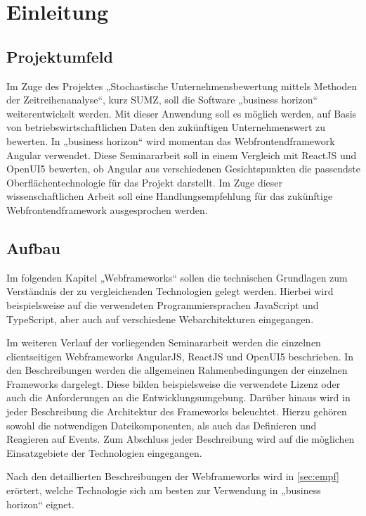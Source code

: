 
\chapter{Einleitung}

\section{Projektumfeld}

Im Zuge des Projektes „Stochastische Unternehmensbewertung mittels Methoden der Zeitreihenanalyse“, kurz SUMZ, soll die Software „business horizon“ weiterentwickelt werden. Mit dieser Anwendung soll es möglich werden, auf Basis von betriebswirtschaftlichen Daten den zukünftigen Unternehmenswert zu bewerten. In „business horizon“ wird momentan das Webfrontendframework Angular verwendet. Diese Seminararbeit soll in einem Vergleich mit ReactJS und OpenUI5 bewerten, ob Angular aus verschiedenen Gesichtspunkten die passendste Oberflächentechnologie für das Projekt darstellt. Im Zuge dieser wissenschaftlichen Arbeit soll eine Handlungsempfehlung für das zukünftige Webfrontendframework ausgesprochen werden.

\section{Aufbau}

Im folgenden Kapitel „Webframeworks“ sollen die technischen Grundlagen zum Verständnis der zu vergleichenden Technologien gelegt werden. Hierbei wird beispielsweise auf die verwendeten Programmiersprachen JavaScript und TypeScript, aber auch auf verschiedene Webarchitekturen eingegangen. 

Im weiteren Verlauf der vorliegenden Seminararbeit werden die einzelnen clientseitigen Webframeworks AngularJS, ReactJS und OpenUI5 beschrieben. In den Beschreibungen werden die allgemeinen Rahmenbedingungen der einzelnen Frameworks dargelegt. Diese bilden beispielsweise die verwendete Lizenz oder auch die Anforderungen an die Entwicklungsumgebung. Darüber hinaus wird in jeder Beschreibung die Architektur des Frameworks beleuchtet. Hierzu gehören sowohl die notwendigen Dateikomponenten, als auch das Definieren und Reagieren auf Events. Zum Abschluss jeder Beschreibung wird auf die möglichen Einsatzgebiete der Technologien eingegangen.

Nach den detaillierten Beschreibungen der Webframeworks wird in \autoref{sec:empf} erörtert, welche Technologie sich am besten zur Verwendung in „business horizon“ eignet.